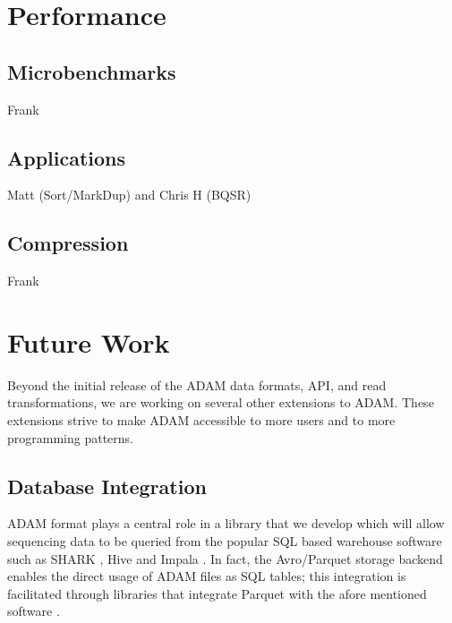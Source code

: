 \documentclass[10pt,twocolumn]{article}
\begin{document}
\section{Performance}
\label{sec:performance}

\subsection{Microbenchmarks}
\label{sec:microbenchmarks}

Frank

\subsection{Applications}
\label{sec:applications}

Matt (Sort/MarkDup) and Chris H (BQSR)

\subsection{Compression}
\label{sec:compression}

Frank

\section{Future Work}
\label{sec:future-work}

Beyond the initial release of the ADAM data formats, API, and read transformations, we are working on several other
extensions to ADAM. These extensions strive to make ADAM accessible to more users and to more programming patterns.

\subsection{Database Integration}
\label{sec:database-integration}

ADAM format plays a central role in a library that we develop which will allow sequencing data to be queried from 
the popular SQL based warehouse software such as SHARK \cite{shark}, Hive \cite{hive} and Impala \cite{impala}. In fact,
the Avro/Parquet storage backend enables the direct usage of ADAM files as SQL tables; this integration is facilitated through libraries 
that integrate Parquet with the afore mentioned software \cite{parquet}.
\end{document}
